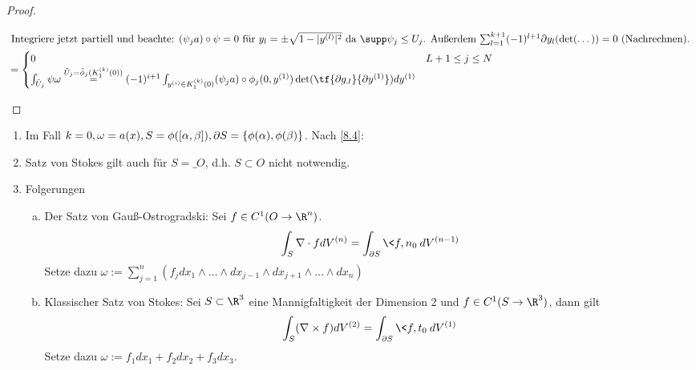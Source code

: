 \begin{proof}
\begin{enumerate}[1)]
\begin{align*}
				\intertext{
					Integriere jetzt partiell und beachte: $(\psi_j a)\circ \psi = 0$ für $y_l = \pm \sqrt{1-|y^{(l)}|^2}$ da $\supp \psi_j \le U_j$.
					Außerdem $\sum_{l=1}^{k+1} (-1)^{l+1} \d y_l (\det (\dotsc)) = 0$ (Nachrechnen).
				}
				&= \begin{cases}
					0 & L+1 \le j \le N \\
					\int_{\tilde U_j} \psi \omega \stackrel{\tilde U_j = \tilde \phi_j(K_1^{(k)}(0))}= (-1)^{i+1} \int_{y^{(i)}\in K_1^{(k)}(0)} (\psi_j a) \circ \phi_j (0,y^{(1)}) \det(\tf{\d g_J}{\d y^{(1)}}) dy^{(1)} & 
				\end{cases}
			\end{align*}
	\end{enumerate}
\end{proof}

\begin{nt*} \label{8.8}
	\begin{enumerate}[1)]
		\item
			Im Fall $k=0, \omega = a(x), S = \phi([\alpha,\beta]), \partial S = \{\phi(\alpha), \phi(\beta)\}$.
			Nach \ref{8.4}:
		\item
			Satz von Stokes gilt auch für $S= \_{O}$, d.h. $S \subset O$ nicht notwendig.
		\item
			Folgerungen
			\begin{enumerate}[a)]
				\item
					Der Satz von Gauß-Ostrogradski:
					Sei $f\in C^1(O\to \R^n)$.
					\[
						\int_{S} \nabla \cdot f dV^{(n)} = \int_{\d S} \<f,n_0\> dV^{(n-1)}
					\]
					Setze dazu $\omega := \sum_{j=1}^n (f_j dx_1 \wedge \dotsc \wedge dx_{j-1} \wedge dx_{j+1} \wedge \dotsc \wedge dx_n)$
				\item
					Klassischer Satz von Stokes:
					Sei $S \subset \R^3$ eine Mannigfaltigkeit der Dimension $2$ und $f \in C^1(S \to \R^3)$, dann gilt
					\[
						\int_S (\nabla \times f) dV^{(2)} = \int_{\d S}\<f,t_0\> dV^{(1)}
					\]
					Setze dazu $\omega := f_1 dx_1 + f_2 dx_2 + f_3 dx_3$.
			\end{enumerate}
	\end{enumerate}
\end{nt*}
